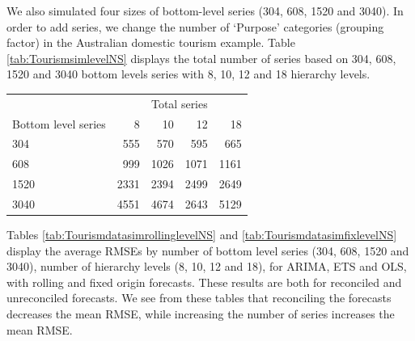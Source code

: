 \documentclass[11pt,a4paper,]{article}
\let\origtable\table
\let\endorigtable\endtable
\renewenvironment{table}[1][2] {
    \expandafter\origtable\expandafter[!htbp]
} {
    \endorigtable
}
\begin{document}
We also simulated four sizes of bottom-level series (304, 608, 1520 and 3040). In order to add series, we change the number of `Purpose' categories (grouping factor) in the Australian domestic tourism example. Table \ref{tab:TourismsimlevelNS} displays the total number of series based on 304, 608, 1520 and 3040 bottom levels series with 8, 10, 12 and 18 hierarchy levels.

\begin{table}

\caption{\label{tab:TourismsimlevelNS}Total number of the series in the hierarchy structure based on the different number of series with 8, 10, 12 and 18 levels of the hierarchy.}
\centering
\begin{tabular}[t]{lrrrr}
\toprule
\multicolumn{1}{c}{} & \multicolumn{4}{c}{Total series} \\
\cmidrule(l{3pt}r{3pt}){2-5}
Bottom level series & 8 & 10 & 12 & 18\\
\midrule
304 & 555 & 570 & 595 & 665\\
608 & 999 & 1026 & 1071 & 1161\\
1520 & 2331 & 2394 & 2499 & 2649\\
3040 & 4551 & 4674 & 2643 & 5129\\
\bottomrule
\end{tabular}
\end{table}

Tables \ref{tab:TourismdatasimrollinglevelNS} and \ref{tab:TourismdatasimfixlevelNS} display the average RMSEs by number of bottom level series (304, 608, 1520 and 3040), number of hierarchy levels (8, 10, 12 and 18), for ARIMA, ETS and OLS, with rolling and fixed origin forecasts. These results are both for reconciled and unreconciled forecasts. We see from these tables that reconciling the forecasts decreases the mean RMSE, while increasing the number of series increases the mean RMSE.
\end{document}
